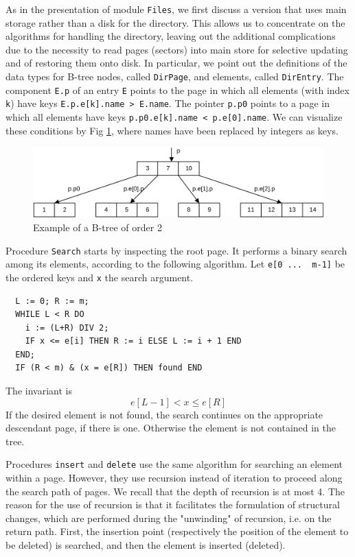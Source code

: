 As in the presentation of module \verb|Files|, we first discuss a version that uses main storage rather
than a disk for the directory. This allows us to concentrate on the algorithms for handling the
directory, leaving out the additional complications due to the necessity to read pages (sectors) into
main store for selective updating and of restoring them onto disk. In particular, we point out the
definitions of the data types for B-tree nodes, called \verb|DirPage|, and elements, called
\verb|DirEntry|.  The component \verb|E.p| of an entry \verb|E| points to the page in which all elements
(with index \verb|k|) have keys \verb|E.p.e[k].name > E.name|. The pointer \verb|p.p0| points to a page
in which all elements have keys \verb|p.p0.e[k].name < p.e[0].name|. We can visualize these conditions
by Fig \ref{fig:b-tree}, where names have been replaced by integers as keys.
\begin{figure}
  \centering
  \includegraphics[width=\textwidth]{i/n}
  \caption{Example of a B-tree of order 2}
  \label{fig:b-tree}
\end{figure}

Procedure \verb|Search| starts by inspecting the root page. It performs a binary search among its
elements, according to the following algorithm. Let \verb|e[0 ...  m-1]| be the ordered keys and
\verb|x| the search argument.
\begin{verbatim}
  L := 0; R := m;
  WHILE L < R DO
    i := (L+R) DIV 2;
    IF x <= e[i] THEN R := i ELSE L := i + 1 END
  END;
  IF (R < m) & (x = e[R]) THEN found END
\end{verbatim}

The invariant is
\[ e[L-1] < x \leq e[R] \]
If the desired element is not found, the search continues on the appropriate descendant page, if
there is one. Otherwise the element is not contained in the tree.

Procedures \verb|insert| and \verb|delete| use the same algorithm for searching an element within a
page.  However, they use recursion instead of iteration to proceed along the search path of pages. We
recall that the depth of recursion is at most 4. The reason for the use of recursion is that it
facilitates the formulation of structural changes, which are performed during the "unwinding" of
recursion, i.e. on the return path. First, the insertion point (respectively the position of the element
to be deleted) is searched, and then the element is inserted (deleted).

